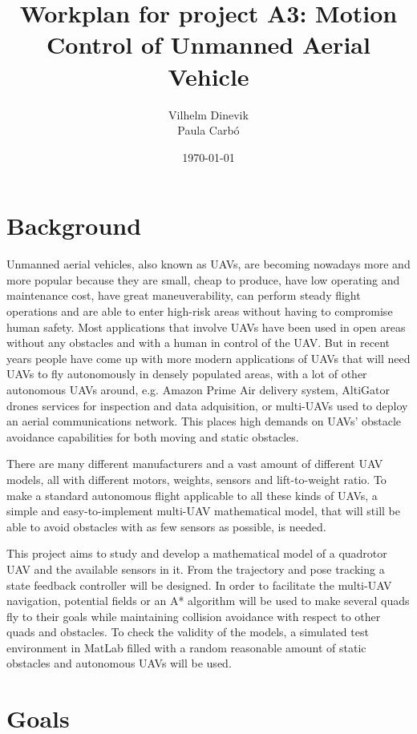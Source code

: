 \documentclass{article}
\title{Workplan for project A3: Motion Control of Unmanned Aerial Vehicle}
\author{Vilhelm Dinevik \\ Paula Carbó}
\date{\today}
\begin{document}
	\maketitle
	
	\bigskip
	\section{Background}
		Unmanned aerial vehicles, also known as UAVs, are becoming nowadays more and more popular because they are small, cheap to produce, have low operating and maintenance cost, have great maneuverability, can perform steady flight operations and are able to enter high-risk areas without having to compromise human safety. Most applications that involve UAVs have been used in open areas without any obstacles and with a human in control of the UAV. But in recent years people have come up with more modern applications of UAVs that will need UAVs to fly autonomously in densely populated areas, with a lot of other autonomous UAVs around, e.g. Amazon Prime Air delivery system, AltiGator drones services for inspection and data adquisition, or multi-UAVs used to deploy an aerial communications network. This places high demands on UAVs’ obstacle avoidance capabilities for both moving and static obstacles.
		
		\vspace{1em}
		There are many different manufacturers and a vast amount of different UAV models, all with different motors, weights, sensors and lift-to-weight ratio. To make a standard autonomous flight applicable to all these kinds of UAVs, a simple and easy-to-implement multi-UAV mathematical model, that will still be able to avoid obstacles with as few sensors as possible, is needed.  
		
		\vspace{1em}
		This project aims to study and develop a mathematical model of a quadrotor UAV and the available sensors in it.  From the trajectory and pose tracking a state feedback controller will be designed. In order to facilitate the multi-UAV navigation, potential fields or an A* algorithm will be used to make several quads fly to their goals while maintaining collision avoidance with respect to other quads and obstacles. To check the validity of the models, a simulated test environment in MatLab filled with a random reasonable amount of static obstacles and autonomous UAVs will be used.

	\bigskip
	\section{Goals}		 %
	
\end{document}
